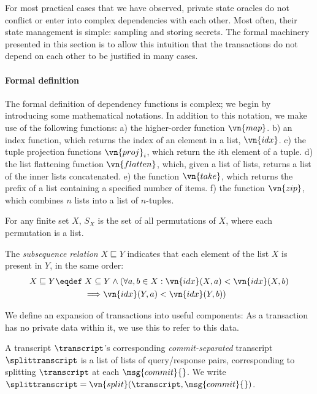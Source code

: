 For most practical cases that we have observed, private state oracles do
  not conflict or enter into complex dependencies with each other. Most often,
  their state management is simple: sampling and storing secrets.
  The formal machinery presented in this section is to allow this intuition that
the transactions do not depend on each other to be justified in many cases.

\paragraph{Formal definition}
The formal definition of dependency functions is complex; we begin by
introducing some mathematical notations. In addition to this notation, we
  make use of the following functions: a) the higher-order function $\vn{map}$.
  b) an index function, which returns the index of an element in a list,
  $\vn{idx}$. c) the tuple projection functions $\vn{proj}_i$, which return
  the $i$th element of a tuple. d) the list flattening function
  $\vn{flatten}$, which, given a list of lists, returns a list of the inner
  lists concatenated. e) the function $\vn{take}$, which returns the prefix of a
  list containing a specified number of items. f) the function $\vn{zip}$, which
  combines $n$ lists into a list of $n$-tuples.

\begin{definition}
  For any finite set $X$, $S_X$ is the set of all permutations of $X$, where each
  permutation is a list.
\end{definition}

\begin{definition}
  The \emph{subsequence relation} $X \sqsubseteq Y$ indicates that each element
  of the list $X$ is present in $Y$, in the same order:
  \begin{align*}
    X \sqsubseteq Y \eqdef \;& X \subseteq Y \land 
    (\forall a, b \in X : \vn{idx}(X, a) < \vn{idx}(X, b) \\ &\Longrightarrow
    \vn{idx}(Y, a) < \vn{idx}(Y, b))
  \end{align*}
\end{definition}

\noindent We define an expansion of transactions into useful components: As a
transaction has no private data within it, we use this to refer to this data.

\begin{definition}
  A transcript $\transcript$'s corresponding \emph{commit-sep\-a\-rat\-ed} transcript
  $\splittranscript$ is a list of lists of query/response pairs, corresponding
  to splitting $\transcript$ at each $\msg{commit}{}$. We write
  $\splittranscript = \vn{split}(\transcript, \msg{commit}{})$.
\end{definition}

